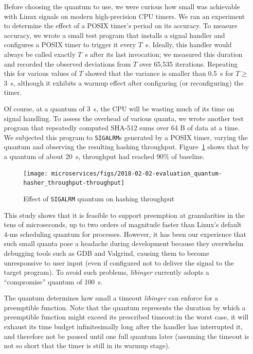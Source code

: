 Before choosing the quantum to use, we were curious how small was achievable with
Linux signals on modern high-precision CPU timers.  We ran an experiment to determine
the effect of a POSIX timer's period on its accuracy.  To measure accuracy, we wrote
a small test program that installs a signal handler and configures a POSIX timer to
trigger it every $T$~\textmu{}s.  Ideally, this handler would always be called
exactly $T$~\textmu{}s after its last invocation; we measured this duration and
recorded the observed deviations from $T$ over 65,535 iterations.  Repeating this
for various values of $T$ showed that the variance is smaller than 0.5~\textmu{}s for
$T \ge$ 3~\textmu{}s, although it exhibits a warmup effect after configuring (or
reconfiguring) the timer.

Of course, at a quantum of 3~\textmu{}s, the CPU will be wasting much of its time on
signal handling.  To assess the overhead of various quanta, we wrote another test
program
that repeatedly computed SHA-512 sums over 64 B of data at a time.  We subjected this
program to \texttt{SIGALRM}s generated by a POSIX timer, varying the quantum and
observing the resulting hashing throughput.  Figure~\ref{fig:shatput} shows that by a
quantum of about 20~\textmu{}s, throughput had reached 90\% of baseline.

\begin{figure}
\texttt{[image: microservices/figs/2018-02-02-evaluation\_quantum-hasher\_throughput-throughput]}
\caption{Effect of \texttt{SIGALRM} quantum on hashing throughput}
\label{fig:shatput}
\end{figure}

This study shows that it is feasible to support preemption at granularities in the
tens of microseconds, up to two orders of magnitude faster than Linux's default 4-ms
scheduling quantum for processes.  However, it has been our experience that such
small quanta pose a headache during development because they overwhelm debugging
tools such as GDB and Valgrind, causing them to become unresponsive to user input
(even if configured not to deliver the signal to the target program).  To avoid such
problems, \textit{libinger} currently adopts a ``compromise'' quantum of
100~\textmu{}s.

The quantum determines how small a timeout \textit{libinger} can enforce for a
preemptible function.  Note that the quantum represents the duration by which a
preemptible
function might exceed its prescribed timeout:\@ in the worst case, it will exhaust
its time budget infinitesimally long after the handler has interrupted it, and
therefore not be paused until one full quantum later (assuming the timeout is not so
short that the timer is still in its warmup stage).

